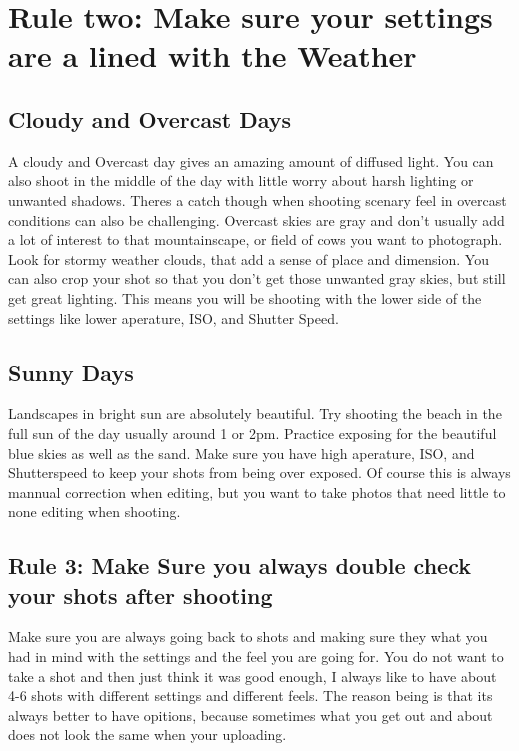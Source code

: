 \documentclass[
]{book}
\begin{document}
\hypertarget{rule-two-make-sure-your-settings-are-a-lined-with-the-weather}{%
\section{Rule two: Make sure your settings are a lined with the Weather}\label{rule-two-make-sure-your-settings-are-a-lined-with-the-weather}}

\hypertarget{cloudy-and-overcast-days}{%
\subsection{Cloudy and Overcast Days}\label{cloudy-and-overcast-days}}

A cloudy and Overcast day gives an amazing amount of diffused light. You can also shoot in the middle of the day with little worry about harsh lighting or unwanted shadows. Theres a catch though when shooting scenary feel in overcast conditions can also be challenging. Overcast skies are gray and don't usually add a lot of interest to that mountainscape, or field of cows you want to photograph. Look for stormy weather clouds, that add a sense of place and dimension. You can also crop your shot so that you don't get those unwanted gray skies, but still get great lighting. This means you will be shooting with the lower side of the settings like lower aperature, ISO, and Shutter Speed.

\hypertarget{sunny-days}{%
\subsection{Sunny Days}\label{sunny-days}}

Landscapes in bright sun are absolutely beautiful. Try shooting the beach in the full sun of the day usually around 1 or 2pm. Practice exposing for the beautiful blue skies as well as the sand. Make sure you have high aperature, ISO, and Shutterspeed to keep your shots from being over exposed. Of course this is always mannual correction when editing, but you want to take photos that need little to none editing when shooting.

\hypertarget{rule-3-make-sure-you-always-double-check-your-shots-after-shooting}{%
\subsection{Rule 3: Make Sure you always double check your shots after shooting}\label{rule-3-make-sure-you-always-double-check-your-shots-after-shooting}}

Make sure you are always going back to shots and making sure they what you had in mind with the settings and the feel you are going for. You do not want to take a shot and then just think it was good enough, I always like to have about 4-6 shots with different settings and different feels. The reason being is that its always better to have opitions, because sometimes what you get out and about does not look the same when your uploading.
\end{document}
